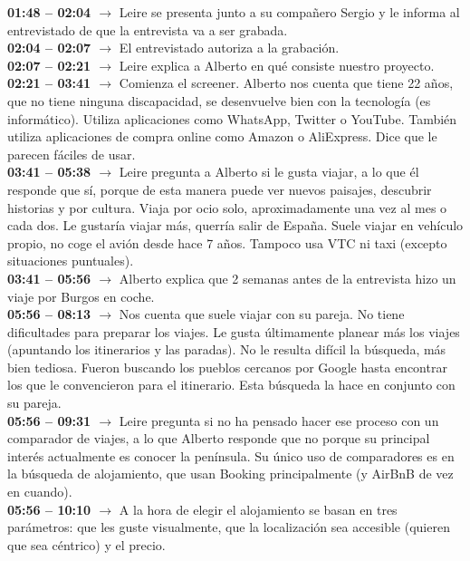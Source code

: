 \noindent\textbf{01:48 -- 02:04 $\rightarrow$} Leire se presenta junto a su compañero Sergio y le informa al entrevistado de que la entrevista va a ser grabada. \\
\textbf{02:04 -- 02:07 $\rightarrow$} El entrevistado autoriza a la grabación. \\
\textbf{02:07 -- 02:21 $\rightarrow$} Leire explica a Alberto en qué consiste nuestro proyecto. \\
\textbf{02:21 -- 03:41 $\rightarrow$} Comienza el screener. Alberto nos cuenta que tiene 22 años, que no tiene ninguna discapacidad, se desenvuelve bien con la tecnología (es informático). 
Utiliza aplicaciones como WhatsApp, Twitter o YouTube. También utiliza aplicaciones de compra online como Amazon o AliExpress. Dice que le parecen 
fáciles de usar. \\
\textbf{03:41 -- 05:38 $\rightarrow$} Leire pregunta a Alberto si le gusta viajar, a lo que él responde que sí, porque de esta manera puede ver nuevos 
paisajes, descubrir historias y por cultura. Viaja por ocio solo, aproximadamente una vez al mes o cada dos. Le gustaría viajar más, querría salir de España. 
Suele viajar en vehículo propio, no coge el avión desde hace 7 años. Tampoco usa VTC ni taxi (excepto situaciones puntuales). \\
\textbf{03:41 -- 05:56 $\rightarrow$} Alberto explica que 2 semanas antes de la entrevista hizo un viaje por Burgos en coche. \\
\textbf{05:56 -- 08:13 $\rightarrow$} Nos cuenta que suele viajar con su pareja. No tiene dificultades para preparar los viajes. Le gusta últimamente 
planear más los viajes (apuntando los itinerarios y las paradas). No le resulta difícil la búsqueda, más bien tediosa. Fueron buscando los pueblos 
cercanos por Google hasta encontrar los que le convencieron para el itinerario. Esta búsqueda la hace en conjunto con su pareja. \\
\textbf{05:56 -- 09:31 $\rightarrow$} Leire pregunta si no ha pensado hacer ese proceso con un comparador de viajes, a lo que Alberto responde que no 
porque su principal interés actualmente es conocer la península. Su único uso de comparadores es en la búsqueda de alojamiento, que usan Booking 
principalmente (y AirBnB de vez en cuando). \\
\textbf{05:56 -- 10:10 $\rightarrow$} A la hora de elegir el alojamiento se basan en tres parámetros: que les guste visualmente, que la localización sea accesible (quieren que sea céntrico) y el precio. \\
